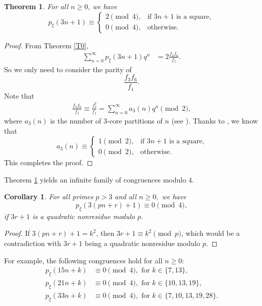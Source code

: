 \documentclass[12pt]{article}
\newtheorem{theorem}{Theorem}[section]
\newtheorem{corollary}{Corollary}[section]
\begin{document}
\begin{theorem} 
\label{thm:3n1_mod4}
For all $n \geq 0$, we have %
$$p_{\xi}(3n+1) \equiv  
\begin{cases}
2 \pmod{4}, & \mbox{if $3n+1$ is a square}, \\
0 \pmod{4}, & \mbox{otherwise}.
\end{cases}$$
\end{theorem}

\begin{proof} From Theorem \ref{T0},
\begin{align}
\sum_{n=0}^{\infty} p_{\xi}(3n+1)q^n & = 2\frac{f_{3}f_{6}}{f_{1}}.
\end{align}
So we only need to consider the parity of 
$$\frac{f_{3}f_{6}}{f_{1}}.$$
Note that
\begin{align*}
\frac{f_{3}f_{6}}{f_{1}} \equiv \frac{f_{3}^3}{f_{1}} = \sum_{n=0}^{\infty} a_3(n)q^n \pmod{2},
\end{align*}
where $a_3(n)$ is the number of 3-core partitions of $n$ (see \cite[Theorem 1]{H-S}). Thanks to \cite[Theorem 7]{daSilva}, we know that
$$ a_{3}(n) \equiv \begin{cases}
1 \pmod{2}, & \text{if $3n+1$ is a square,}\\
0 \pmod{2}, & \text{otherwise.}
\end{cases}$$
This completes the proof.
\end{proof}

Theorem \ref{thm:3n1_mod4} yields an infinite family of congruences modulo $4$.

\begin{corollary} For all primes $p > 3$ and all $n\geq 0,$ we have
	$$p_{\xi}(3(pn+r)+1) \equiv 0 \pmod{4},$$
	if $3r+1$ is a quadratic nonresidue modulo $p$.
\end{corollary}

\begin{proof}
If $3(pn+r)+1 = k^2$, then $3r+1 \equiv k^2 \pmod{p}$, which would be a contradiction with $3r+1$ being a quadratic nonresidue modulo $p$.
\end{proof}	

For example, the following congruences hold for all $n\geq 0:$  
\begin{align*}
p_{\xi}(15n+k) & \equiv 0 \pmod{4}, \mbox{ for } k \in \{ 7, 13 \}, \\
p_{\xi}(21n+k) & \equiv 0 \pmod{4}, \mbox{ for } k \in \{ 10, 13, 19 \}, \\
p_{\xi}(33n+k) & \equiv 0 \pmod{4}, \mbox{ for } k \in \{ 7, 10, 13, 19, 28 \}.
\end{align*}
\end{document}
